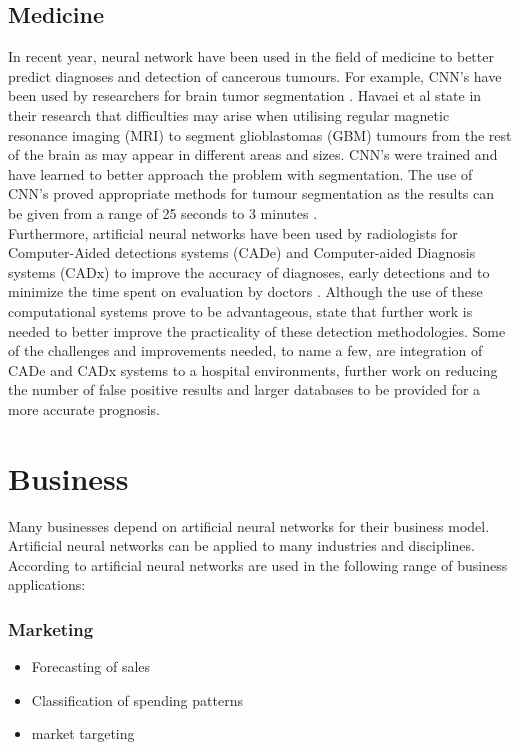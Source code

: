 \subsection*{Medicine}
In recent year, neural network have been used in the field of medicine to better predict diagnoses and detection of cancerous tumours. For example, CNN's have been used by researchers for brain tumor segmentation \citep{DBLP}. Havaei et al state in their research that difficulties may arise when utilising regular magnetic resonance imaging (MRI) to segment glioblastomas (GBM) tumours from the rest of the brain as may appear in different areas and sizes. CNN's were trained and have learned to better approach the problem with segmentation. The use of CNN's proved appropriate methods for tumour segmentation as the results can be given from a range of 25 seconds to 3 minutes \citep{DBLP}. \\
Furthermore, artificial neural networks have been used by radiologists for Computer-Aided detections systems (CADe) and Computer-aided Diagnosis systems (CADx) to improve the accuracy of diagnoses, early detections and to minimize the time spent on evaluation by doctors \citep{CADe}. Although the use of these computational systems prove to be advantageous, \citeauthor{CADe} state that further work is needed to better improve the practicality of these detection methodologies. Some of the challenges and improvements needed, to name a few, are integration of CADe and CADx systems to a hospital environments, further work on reducing the number of false positive results and larger databases to be provided for a more accurate prognosis. 

\section*{Business}
Many businesses depend on artificial neural networks for their business model.
Artificial neural networks can be applied to many industries and disciplines. According to \citet{geocities}
artificial neural networks are used in the following range of business applications:
\subsubsection*{Marketing}
\begin{itemize}
	\item Forecasting of sales
	\item Classification of spending patterns 
	\item market targeting
\end{itemize}

